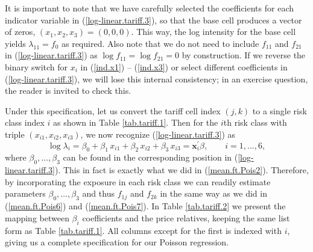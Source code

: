 \documentclass[12pt]{article}
\begin{document}
It is important to note that we have carefully selected the coefficients for each indicator variable in (\ref{log-linear.tariff.3}), so that the base cell produces a vector of zeros, $(x_1, x_2,x_3)=(0, 0, 0)$. This way, the log intensity for the base cell yields $\lambda_{11}=f_0$ as required. Also note that we do not need to include $f_{11}$ and $f_{21}$ in (\ref{log-linear.tariff.3}) as $\log f_{11}=\log f_{21}=0$ by construction. If we reverse the binary switch for $x_i$ in  (\ref{ind.x1}) -- (\ref{ind.x3}) or select different coefficients in (\ref{log-linear.tariff.3}), we will lose this internal consistency;
in an exercise question, the reader is invited to check this. 

Under this specification, let us convert the tariff cell index $(j,k)$ to a single risk class index $i$ as shown in Table \ref{tab.tariff.1}. Then for the $i$th risk class with triple $(x_{i1}, x_{i2},x_{i3})$, we now recognize  (\ref{log-linear.tariff.3}) as
\begin{equation}
\label{log-linear.tariff.4}
\log \lambda_{i}= \beta_0+ \beta_1 \, x_{i1} + \beta_{2} \, x_{i2} +\beta_3  \, x_{i3}=\mathbf{ x}^{\prime}_i\beta, \qquad i=1, \ldots, 6,
\end{equation} where $\beta_0, \ldots, \beta_3$ can be found in the corresponding position in (\ref{log-linear.tariff.3}). This in fact is exactly what we did in (\ref{mean.ft.Pois2}). Therefore, by incorporating the exposure in each risk class we can readily estimate parameters $\beta_0, \ldots, \beta_3$ and thus $f_{1j}$ and $f_{2k}$ in the same way as we did in (\ref{mean.ft.Pois6}) and (\ref{mean.ft.Pois7}). In Table \ref{tab.tariff.2} we present the mapping between $\beta_i$ coefficients and the price relatives, keeping the same list form as Table \ref{tab.tariff.1}. All columns except for the first is indexed with $i$, giving us a complete specification for our Poisson regression.
\end{document}
